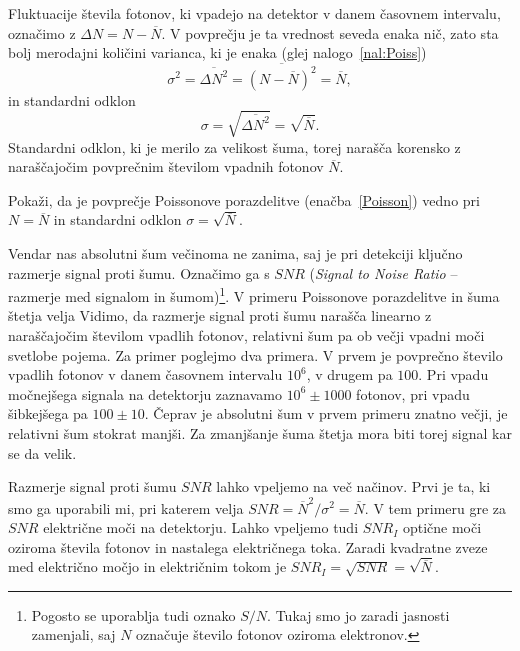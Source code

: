Fluktuacije števila fotonov, ki vpadejo na detektor v danem časovnem 
intervalu, označimo z $\Delta N = N-\overline{N}$. V povprečju je ta vrednost seveda enaka nič, 
zato sta bolj merodajni količini varianca, ki je enaka (glej nalogo~\ref{nal:Poiss})
\begin{equation}
\sigma^2 = \overline{\Delta N^2}= \overline{(N-\overline{N})^2} = \overline{N},
\label{varianca}
\end{equation}
in standardni odklon
\begin{equation}
\sigma = \sqrt{\overline{\Delta N^2}} = \sqrt{\overline{N}}.
\label{sigma}
\end{equation}
Standardni odklon, ki je merilo za velikost šuma, torej narašča korensko 
z naraščajočim povprečnim številom vpadnih fotonov $\overline{N}$. 
\begin{definition}
Pokaži, da je povprečje Poissonove porazdelitve (enačba~\ref{Poisson}) vedno pri $N = \overline{N}$
in standardni odklon $\sigma = \sqrt{\overline{N}}$.
\label{nal:Poiss}
\end{definition}

Vendar nas absolutni šum večinoma ne zanima, 
saj je pri detekciji ključno razmerje signal proti šumu. 
Označimo ga s $SNR$ ({\it Signal to Noise Ratio} --
razmerje med 
signalom in šumom)\footnote{Pogosto se uporablja tudi oznako $S/N$. Tukaj smo jo 
zaradi jasnosti zamenjali, saj $N$ označuje število fotonov oziroma elektronov.}.
V primeru Poissonove porazdelitve in šuma štetja velja
Vidimo, da razmerje signal proti šumu narašča linearno z naraščajočim številom vpadlih fotonov, 
relativni šum pa ob večji vpadni moči svetlobe pojema. 
Za primer poglejmo dva primera. V prvem je povprečno število vpadlih 
fotonov v danem časovnem intervalu $10^6$, v drugem pa $100$. 
Pri vpadu močnejšega signala 
na detektorju zaznavamo $10^6 \pm 1000$ fotonov, pri vpadu šibkejšega
pa $100 \pm 10$. Čeprav je absolutni šum v prvem primeru znatno večji, 
je relativni šum stokrat manjši. Za zmanjšanje šuma štetja mora biti 
torej signal kar se da velik. 

\begin{remark}
Razmerje signal proti šumu $SNR$ lahko vpeljemo na več načinov. Prvi je ta, ki smo ga 
uporabili mi, pri katerem velja $SNR = \overline{N}^2/\sigma^2 = \overline{N}$. 
V tem primeru gre za $SNR$ električne moči na detektorju. Lahko vpeljemo tudi $SNR_I$ optične 
moči oziroma števila fotonov in nastalega električnega toka. Zaradi kvadratne 
zveze med električno močjo in električnim tokom je $SNR_I=\sqrt{SNR}=\sqrt{\overline{N}}$.
\end{remark}

